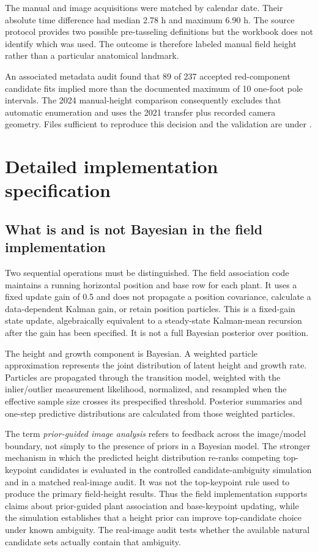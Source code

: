 \documentclass[review,12pt,authoryear]{elsarticle}
\begin{document}
The manual and image acquisitions were matched by calendar date. Their absolute time difference had median 2.78 h and maximum 6.90 h. The source protocol provides two possible pre-tasseling definitions but the workbook does not identify which was used. The outcome is therefore labeled manual field height rather than a particular anatomical landmark.

An associated metadata audit found that 89 of 237 accepted red-component candidate fits implied more than the documented maximum of 10 one-foot pole intervals. The 2024 manual-height comparison consequently excludes that automatic enumeration and uses the 2021 transfer plus recorded camera geometry. Files sufficient to reproduce this decision and the validation are under .

\section{Detailed implementation specification}
\label{sec:s-specification}

\subsection{What is and is not Bayesian in the field implementation}

Two sequential operations must be distinguished. The field association code maintains a running horizontal position and base row for each plant. It uses a fixed update gain of 0.5 and does not propagate a position covariance, calculate a data-dependent Kalman gain, or retain position particles. This is a fixed-gain state update, algebraically equivalent to a steady-state Kalman-mean recursion after the gain has been specified. It is not a full Bayesian posterior over position.

The height and growth component is Bayesian. A weighted particle approximation represents the joint distribution of latent height and growth rate. Particles are propagated through the transition model, weighted with the inlier/outlier measurement likelihood, normalized, and resampled when the effective sample size crosses its prespecified threshold. Posterior summaries and one-step predictive distributions are calculated from those weighted particles.

The term \emph{prior-guided image analysis} refers to feedback across the image/model boundary, not simply to the presence of priors in a Bayesian model. The stronger mechanism in which the predicted height distribution re-ranks competing top-keypoint candidates is evaluated in the controlled candidate-ambiguity simulation and in a matched real-image audit. It was not the top-keypoint rule used to produce the primary field-height results. Thus the field implementation supports claims about prior-guided plant association and base-keypoint updating, while the simulation establishes that a height prior can improve top-candidate choice under known ambiguity. The real-image audit tests whether the available natural candidate sets actually contain that ambiguity.
\end{document}

